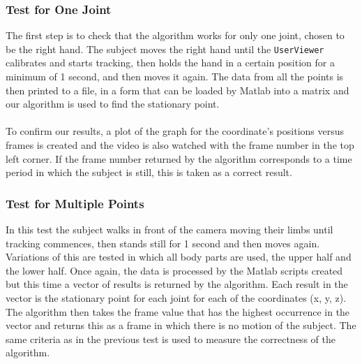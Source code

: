 \documentclass[10pt]{article}
\begin{document}
\subsubsection{Test for One Joint}
The first step is to check that the algorithm works for only one joint, chosen to be the right hand. The subject moves the right hand until the \texttt{UserViewer} calibrates and starts tracking, then holds the hand in a certain position for a minimum of 1 second, and then moves it again. The data from all the points is then printed to a file, in a form that can be loaded by Matlab into a matrix and our algorithm is used to find the stationary point. \\\\
\noindent
To confirm our results, a plot of the graph for the coordinate's positions versus frames is created and the video is also watched with the frame number in the top left corner. If the frame number returned by the algorithm corresponds to a time period in which the subject is still, this is taken as a correct result. 
\subsubsection{Test for Multiple Points}
\noindent 
In this test the subject walks in front of the camera moving their limbs until tracking commences, then stands still for 1 second and then moves again. Variations of this are tested in which all body parts are used, the upper half and the lower half. Once again, the data is processed by the Matlab scripts created but this time a vector of results is returned by the algorithm. Each result in the vector is the stationary point for each joint for each of the coordinates (x, y, z). The algorithm then takes the frame value that has the highest occurrence in the vector and returns this as a frame in which there is no motion of the subject. The same criteria as in the previous test is used to measure the correctness of the algorithm. 
\end{document}
